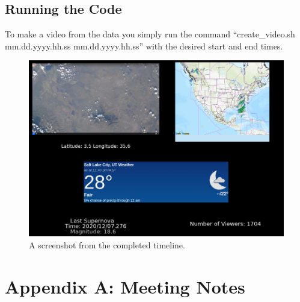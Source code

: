 \documentclass{article}
\begin{document}
  \subsection{Running the Code}
   To make a video from the data you simply run the command “create\_video.sh mm.dd.yyyy.hh.ss mm.dd.yyyy.hh.ss” with the desired start and end times.
  \begin{figure}[H]
    \centering
    \includegraphics[width=\linewidth]{img/timeline_screenshot.png}
    \caption{A screenshot from the completed timeline.}
    \label{timeline}
  \end{figure}

\section{Appendix A: Meeting Notes}
\end{document}
